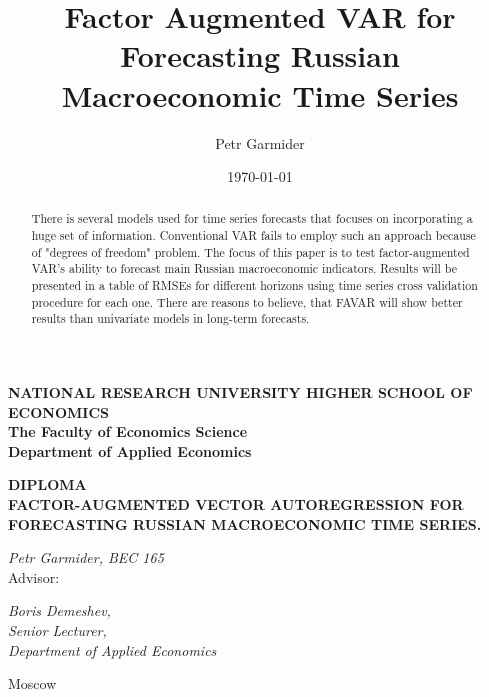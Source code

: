 \documentclass[a4paper, 14pt]{article}
\title{Factor Augmented VAR for Forecasting Russian Macroeconomic Time Series}
\author{Petr Garmider}
\date{\today}
\begin{document}
	\newpage
	\thispagestyle{empty}
	\begin{center}
		
		\vspace{0.1ex}
		
		{\textbf{NATIONAL RESEARCH UNIVERSITY HIGHER SCHOOL OF ECONOMICS}}\\
		\vspace{1ex}
		{\textbf{The Faculty of Economics Science}}\\
		\vspace{1ex}
		{\textbf{
				Department of Applied Economics}}\\
		
	\end{center}
	\vspace{5ex}
	\begin{center}
		\vspace{3ex}
		{\textbf{DIPLOMA}}\\
		\vspace{3ex}
		{
			\vspace{2ex} \textbf{FACTOR-AUGMENTED VECTOR AUTOREGRESSION FOR FORECASTING RUSSIAN MACROECONOMIC TIME SERIES.}}
	\end{center}
	\begin{flushright}
		\vspace{5ex}
		\noindent
		\textit{Petr Garmider, BEC 165}
		\\
		\vspace{5ex}
		Advisor:\\
		\vspace{2ex}
		
		\textit{Boris Demeshev, \\Senior Lecturer, \\Department of Applied Economics}\\
		
		
	\end{flushright}

	\vspace{18ex}
	
	\begin{center}
		\vspace{3ex}
		{Moscow}\\
		\vspace{1ex}{17 April 2020}
	\end{center}	
	
	\newpage
	
\begin{abstract}
	There is several models used for time series forecasts that focuses on incorporating a huge set of information. Conventional VAR fails to employ such an approach because of "degrees of freedom" problem. The focus of this paper is to test factor-augmented VAR's ability to forecast main Russian macroeconomic indicators. Results will be presented in a table of RMSEs for different horizons using time series cross validation procedure for each one. There are reasons to believe, that FAVAR will show better results than univariate models in long-term forecasts.
	 
\end{abstract}
\end{document}
